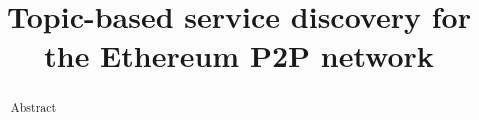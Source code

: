 \documentclass[sigconf]{acmart}
\begin{document}
\title{Topic-based service discovery for the Ethereum P2P network}
\author{}


\begin{abstract}
Abstract
\end{abstract}

\maketitle







%





%









\clearpage


\end{document}

